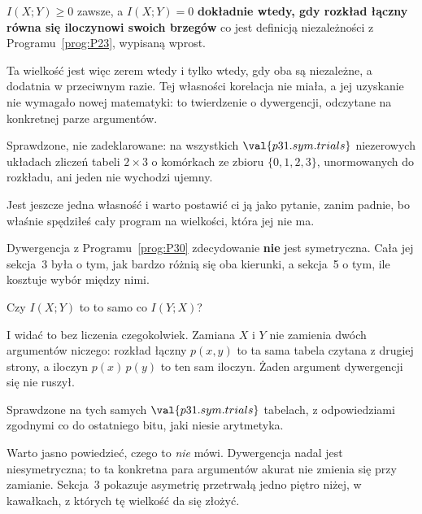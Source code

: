 \begin{fr}
\begin{ansblock}
$I(X; Y) \ge 0$ zawsze, a $I(X; Y) = 0$ \textbf{dokładnie wtedy, gdy rozkład
łączny równa się iloczynowi swoich brzegów} \dash{} co jest definicją
niezależności z Programu~\ref{prog:P23}, wypisaną wprost.
\end{ansblock}

Ta wielkość jest więc zerem wtedy i tylko wtedy, gdy oba są niezależne, a
dodatnia w przeciwnym razie. Tej własności korelacja nie miała, a jej
uzyskanie nie wymagało nowej matematyki: to twierdzenie o dywergencji,
odczytane na konkretnej parze argumentów.

Sprawdzone, nie zadeklarowane: na wszystkich $\val{p31.sym.trials}$
niezerowych układach zliczeń tabeli $2 \times 3$ o komórkach ze zbioru
$\{0, 1, 2, 3\}$, unormowanych do rozkładu, ani jeden nie wychodzi ujemny.
\end{fr}

\begin{fr}
Jest jeszcze jedna własność i warto postawić ci ją jako pytanie, zanim
padnie, bo właśnie spędziłeś cały program na wielkości, która jej nie ma.

Dywergencja z Programu~\ref{prog:P30} zdecydowanie \textbf{nie} jest
symetryczna. Cała jej sekcja~3 była o tym, jak bardzo różnią się oba
kierunki, a sekcja~5 o tym, ile kosztuje wybór między nimi.

Czy $I(X; Y)$ to to samo co $I(Y; X)$?
\dotline
\nextframe
\end{fr}

\begin{fr}

I widać to bez liczenia czegokolwiek. Zamiana $X$ i $Y$ nie zamienia dwóch
argumentów niczego: rozkład łączny $p(x, y)$ to ta sama tabela czytana z
drugiej strony, a iloczyn $p(x)\,p(y)$ to ten sam iloczyn. Żaden argument
dywergencji się nie ruszył.

Sprawdzone na tych samych $\val{p31.sym.trials}$ tabelach, z
odpowiedziami zgodnymi co do ostatniego bitu, jaki niesie arytmetyka.

\begin{note}
Warto jasno powiedzieć, czego to \emph{nie} mówi. Dywergencja nadal jest
niesymetryczna; to ta konkretna para argumentów akurat nie zmienia się przy
zamianie. Sekcja~3 pokazuje asymetrię przetrwałą jedno piętro niżej, w
kawałkach, z których tę wielkość da się złożyć.
\end{note}
\end{fr}

